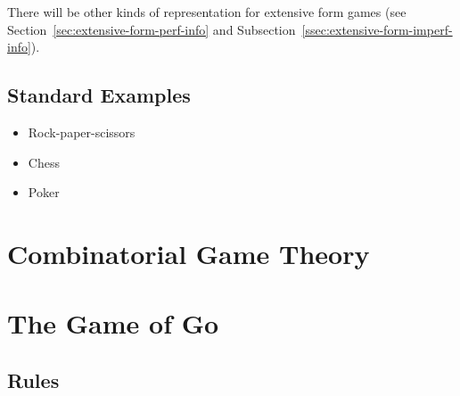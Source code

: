 There will be other kinds of representation for extensive form games (see Section~\ref{sec:extensive-form-perf-info} and Subsection~\ref{ssec:extensive-form-imperf-info}).

\subsection{Standard Examples}

\todo %

\begin{itemize}
  \item{Rock-paper-scissors}
  \item{Chess}
  \item{Poker}
\end{itemize}

\section{Combinatorial Game Theory}
\label{sec:CGT}

\todo

\section{The Game of Go}
\label{sec:Go}

\subsection{Rules}

